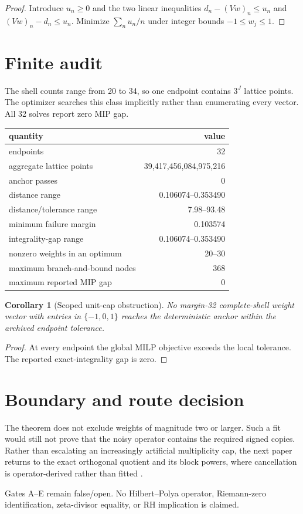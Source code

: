\documentclass[11pt]{article}
\newtheorem{corollary}[theorem]{Corollary}
\theoremstyle{remark}
\begin{document}
\begin{proof}
Introduce $u_n\ge0$ and the two linear inequalities
$d_n-(Vw)_n\le u_n$ and $(Vw)_n-d_n\le u_n$.  Minimize
$\sum_nu_n/n$ under integer bounds $-1\le w_j\le1$.
\end{proof}

\section{Finite audit}

The shell counts range from 20 to 34, so one endpoint contains $3^J$ lattice
points.  The optimizer searches this class implicitly rather than enumerating
every vector.  All 32 solves report zero MIP gap.

\begin{center}
\small
\begin{tabular}{lr}
\toprule
quantity & value\\
\midrule
endpoints & 32\\
aggregate lattice points & 39,417,456,084,975,216\\
anchor passes & 0\\
distance range & 0.106074--0.353490\\
distance/tolerance range & 7.98--93.48\\
minimum failure margin & 0.103574\\
integrality-gap range & 0.106074--0.353490\\
nonzero weights in an optimum & 20--30\\
maximum branch-and-bound nodes & 368\\
maximum reported MIP gap & 0\\
\bottomrule
\end{tabular}
\end{center}

\begin{corollary}[Scoped unit-cap obstruction]
No margin-32 complete-shell weight vector with entries in $\{-1,0,1\}$ reaches
the deterministic anchor within the archived endpoint tolerance.
\end{corollary}

\begin{proof}
At every endpoint the global MILP objective exceeds the local tolerance.  The
reported exact-integrality gap is zero.
\end{proof}

\section{Boundary and route decision}

The theorem does not exclude weights of magnitude two or larger.  Such a fit
would still not prove that the noisy operator contains the required signed
copies.  Rather than escalating an increasingly artificial multiplicity cap,
the next paper returns to the exact orthogonal quotient and its block powers,
where cancellation is operator-derived rather than fitted
\citep{WangRH245,WangRH246}.

Gates A--E remain false/open.  No Hilbert--Polya operator, Riemann-zero
identification, zeta-divisor equality, or RH implication is claimed.



\end{document}

